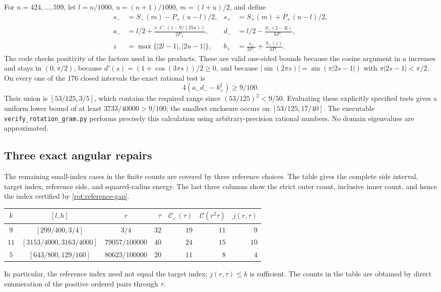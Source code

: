\documentclass[11pt,reqno]{amsart}
\numberwithin{equation}{section}
\begin{document}
For $n=424,\ldots,599$, let $l=n/1000$, $u=(n+1)/1000$,
$m=(l+u)/2$, and define
\begin{align*}
 s_-&=S_-(m)-P_+(u-l)/2,&
 s_+&=S_+(m)+P_+(u-l)/2,\\
 a_-&=l/2+\frac{s_- C_-(1-9/(25u))}{2P_+},&
 d_-&=l/2-\frac{S_+(2-3l)}{6P_-},\\
 z&=\max\{|2l-1|,|2u-1|\},&
 b_+&=\frac{s_+}{2P_-}+\frac{S_+(z)}{4P_-}.
\end{align*}
The code checks positivity of the factors used in the products. These
are valid one-sided bounds because the cosine argument in $a$ increases
and stays in $(0,\pi/2)$, because
$d'(s)=(1+\cos(3\pi s))/2\geq0$, and because
$|\sin(2\pi s)|=\sin(\pi|2s-1|)$ with $\pi|2s-1|<\pi/2$.
On every one of the 176 closed intervals the exact rational test is
\begin{equation}\label{rot:gram-test}
 4(a_-d_- - b_+^2)\geq9/100.
\end{equation}
Their union is $[53/125,3/5]$, which contains the required range since
$(53/125)^2<9/50$. Evaluating these explicitly specified tests gives
a uniform lower bound of at least $3733/40000>9/100$; the smallest
enclosure occurs on $[53/125,17/40]$. The executable
\nolinkurl{verify_rotation_gram.py} performs precisely this calculation
using arbitrary-precision rational numbers. No domain eigenvalues are
approximated.

\subsection{Three exact angular repairs}
\label{rot:angular-repairs}

The remaining small-index cases in the finite counts are covered by
three reference choices. The table gives the complete side interval,
target index, reference side, and squared-radius energy. The last three
columns show the strict outer count, inclusive inner count, and hence
the index certified by \eqref{rot:reference-gap}.
\begin{center}
\begin{tabular}{c|c|c|r|r|r|r}
 $k$&$[l,h]$&$r$&$\tau$&$\mathcal C_{<}(\tau)$&
 $\mathcal C(r^2\tau)$&$j(r,\tau)$\\ \hline
 $9$&$[299/400,3/4]$&$3/4$&$32$&$19$&$11$&$9$\\
 $11$&$[3153/4000,3163/4000]$&$79057/100000$&$40$&$24$&$15$&$10$\\
 $5$&$[643/800,129/160]$&$80623/100000$&$20$&$11$&$8$&$4$
\end{tabular}
\end{center}
In particular, the reference index need not equal the target index;
$j(r,\tau)\leq k$ is sufficient. The counts in the table are obtained
by direct enumeration of the positive ordered pairs through $\tau$.
\end{document}
